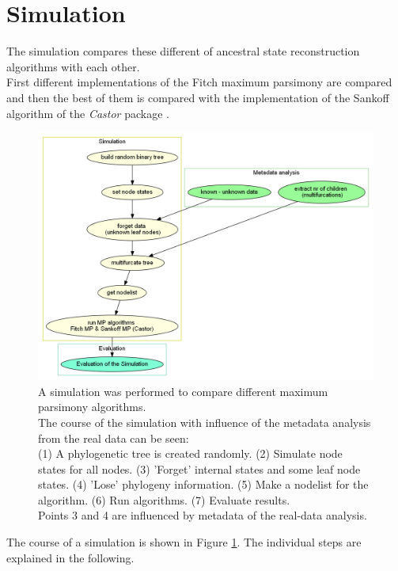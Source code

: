   \section{Simulation}\label{sec:methods - simulation}
    The simulation compares these different of ancestral state reconstruction algorithms with each 
      other. \\
    First different implementations of the Fitch maximum parsimony are compared and then the best of 
      them is compared with the implementation of the Sankoff algorithm of the \textit{Castor} package 
      \cite{Louca2017}. \\

    \begin{figure}[h!]
      \centering
      \includegraphics[width=1\textwidth]{Figures/Workflow-Simulation.png}
      \caption{A simulation was performed to compare different maximum parsimony algorithms. \\
        The course of the simulation with influence of the metadata analysis from the real data can
          be seen: \\
        (1) A phylogenetic tree is created randomly. (2) Simulate node states for all nodes. (3) 
          'Forget' internal states and some leaf node states. (4) 'Lose' phylogeny information. (5) 
          Make a nodelist for the algorithm. (6) Run algorithms. (7) Evaluate results. \\
        Points 3 and 4 are influenced by metadata of the real-data analysis.}
      \label{fig:Simulation Workflow}
    \end{figure}
    The course of a simulation is shown in Figure \ref{fig:Simulation Workflow}. The individual steps 
      are explained in the following. \\

